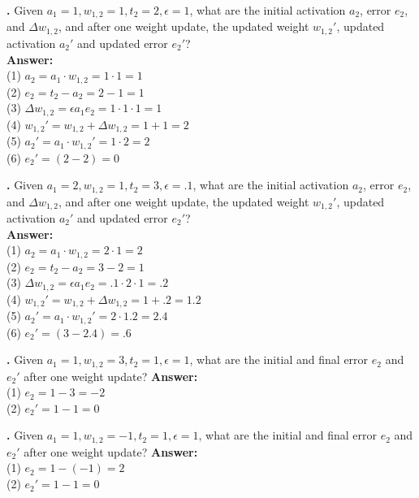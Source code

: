 \noindent
{}
{\bf \theLMSCounter.}  Given $a_1 = 1, w_{1,2} = 1, t_2 = 2,\epsilon = 1$, what are the initial activation $a_2$, error $e_2$, and $\Delta w_{1,2}$, and after one weight update, the updated weight $w_{1,2}'$, updated activation  $a_2'$ and updated error $e_2'$? \\
{\bf Answer:}  \\
(1) $a_2 = a_1 \cdot w_{1,2} = 1 \cdot 1 = 1$ \\
(2) $e_2 = t_2 - a_2 = 2 - 1 = 1 $ \\
(3) $\Delta w_{1,2} = \epsilon a_1 e_2 = 1 \cdot 1 \cdot 1 = 1$ \\
(4) $w_{1,2}' = w_{1,2} + \Delta w_{1,2}  = 1 + 1 = 2$\\
(5) $a_2' =  a_1 \cdot w_{1,2}' = 1 \cdot 2 = 2$\\
(6) $e_2' = (2-2) = 0$
\bigskip

\noindent
{}
{\bf \theLMSCounter.}  Given $a_1 = 2, w_{1,2} = 1, t_2 = 3 ,\epsilon = .1$, what are the initial activation $a_2$, error $e_2$, and $\Delta w_{1,2}$, and after one weight update, the updated weight $w_{1,2}'$, updated activation  $a_2'$ and updated error $e_2'$? \\
{\bf Answer:}  \\
(1) $a_2 = a_1 \cdot w_{1,2} = 2 \cdot 1 = 2$ \\
(2) $e_2 = t_2 - a_2 = 3 - 2 = 1 $ \\
(3) $\Delta w_{1,2} = \epsilon a_1 e_2 = .1 \cdot 2 \cdot 1 = .2$ \\
(4) $w_{1,2}' = w_{1,2} + \Delta w_{1,2}  = 1 + .2 = 1.2$\\
(5) $a_2' =  a_1 \cdot w_{1,2}' = 2 \cdot 1.2 = 2.4$\\
(6) $e_2' = (3 - 2.4) = .6$
\bigskip

\noindent
{}
{\bf \theLMSCounter.}  Given $a_1 = 1, w_{1,2} = 3, t_2 = 1 ,\epsilon = 1$, what are the initial and final error $e_2$ and $e_2'$ after one weight update? 
{\bf Answer:}  \\
(1) $e_2 =  1 - 3  = -2 $ \\
(2) $e_2' = 1 - 1 = 0$
\bigskip

\noindent
{}
{\bf \theLMSCounter.}  Given $a_1 = 1, w_{1,2} = -1, t_2 = 1 ,\epsilon = 1$, what are the initial and final error $e_2$ and $e_2'$ after one weight update? 
{\bf Answer:}  \\
(1) $e_2 =  1 - (-1)  = 2 $ \\
(2) $e_2' = 1 - 1 = 0$
\bigskip


